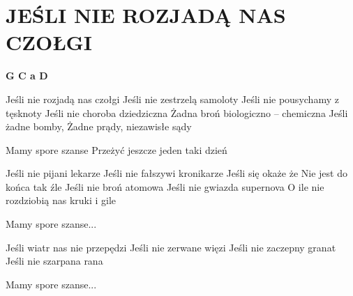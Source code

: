 \documentclass[../../../songbook.tex]{subfiles}
\begin{document}
\TabPositions{8cm} %
\section*{JEŚLI NIE ROZJADĄ NAS CZOŁGI}
\vspace{0.5cm}

{\color{red}\textbf{G C a D} } \newline

Jeśli nie rozjadą nas czołgi			 \newline
Jeśli nie zestrzelą samoloty			 \newline
Jeśli nie pousychamy z tęsknoty 		 \newline
Jeśli nie choroba dziedziczna 			 \newline
Żadna broń biologiczno – chemiczna 		 \newline
Jeśli żadne bomby, 						 \newline
Żadne prądy, niezawisłe sądy			 \newline

\-\hspace{1cm} Mamy spore szanse 			 \newline
\-\hspace{1cm} Przeżyć jeszcze jeden taki dzień 	 \newline

Jeśli nie pijani lekarze		\newline
Jeśli nie fałszywi kronikarze	\newline
Jeśli się okaże że				\newline
Nie jest do końca tak źle		\newline
Jeśli nie broń atomowa			\newline
Jeśli nie gwiazda supernova		\newline
O ile nie rozdziobią nas kruki i gile 	\newline

\-\hspace{1cm} Mamy spore szanse...	\newline

Jeśli wiatr nas nie przepędzi	\newline
Jeśli nie zerwane więzi			\newline
Jeśli nie zaczepny granat		\newline
Jeśli nie szarpana rana			\newline

\-\hspace{1cm} Mamy spore szanse...	
\end{document}
